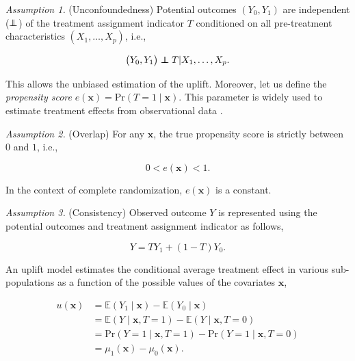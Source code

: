 \documentclass{article}
\newcommand\independent{\protect\mathpalette{\protect\independenT}{\perp}}
\def\independenT#1#2{\mathrel{\rlap{$#1#2$}\mkern2mu{#1#2}}}
\def\x{\mathbf x}
\begin{document}
{\it Assumption 1.} (Unconfoundedness) Potential outcomes $(Y_0,Y_1)$ are independent ($\independent$) of the treatment assignment indicator $T$ conditioned on all pre-treatment characteristics $(X_1, \ldots, X_p)$, i.e.,

$$\big( Y_0, Y_1 \big) \independent T | X_1,\ldots,X_p. $$

This allows the unbiased estimation of the uplift. Moreover, let us define the \textit{propensity score} $e(\x)= \mathrm{Pr}(T=1 \mid \x)$. This parameter is widely used to estimate treatment effects from observational data \citep{rubin1974estimating,rosenbaum1983central,athey2015machine}.

{\it Assumption 2.} (Overlap) For any $\x$, the true propensity score is strictly between $0$ and $1$, i.e., 

$$0 < e(\x) < 1.$$

In the context of complete randomization, $e(\x)$ is a constant. 

{\it Assumption 3.} (Consistency) Observed outcome $Y$ is represented using the potential outcomes and treatment assignment indicator as follows,

$$Y=TY_1 + (1-T)Y_0.$$


An uplift model estimates the conditional average treatment effect in various sub-populations as a function of the possible values of the covariates $\x$,

\begin{align}
    u(\x) &= \mathbb{E} ( Y_1 \mid \x) - \mathbb{E} ( Y_0 \mid \x) \nonumber\\
     &= \mathbb{E} ( Y \mid \x, T=1) - \mathbb{E} ( Y \mid \x, T=0) \nonumber \\
     &= \mathrm{Pr} ( Y = 1 \mid \x, T=1) - \mathrm{Pr} ( Y = 1 \mid \x, T=0) \nonumber \\
      &=\mu_1(\x) - \mu_0(\x). 
    \label{eq:uplift}
\end{align}
\end{document}
